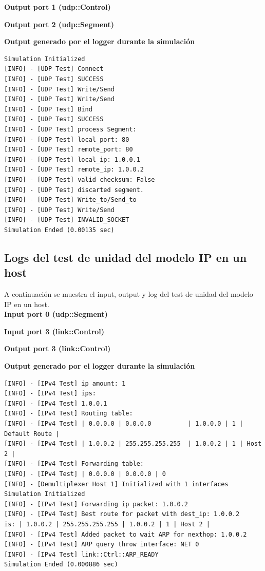 \documentclass[10pt,a4paper]{article}
\begin{document}
\textbf{Output port 1 (udp::Control)}


\textbf{Output port 2 (udp::Segment)}


\textbf{Output generado por el logger durante la simulación}
\begin{lstlisting}
Simulation Initialized
[INFO] - [UDP Test] Connect
[INFO] - [UDP Test] SUCCESS
[INFO] - [UDP Test] Write/Send
[INFO] - [UDP Test] Write/Send
[INFO] - [UDP Test] Bind
[INFO] - [UDP Test] SUCCESS
[INFO] - [UDP Test] process Segment: 
[INFO] - [UDP Test] local_port: 80
[INFO] - [UDP Test] remote_port: 80
[INFO] - [UDP Test] local_ip: 1.0.0.1
[INFO] - [UDP Test] remote_ip: 1.0.0.2
[INFO] - [UDP Test] valid checksum: False
[INFO] - [UDP Test] discarted segment.
[INFO] - [UDP Test] Write_to/Send_to
[INFO] - [UDP Test] Write/Send
[INFO] - [UDP Test] INVALID_SOCKET
Simulation Ended (0.00135 sec)
\end{lstlisting}

\subsection{Logs del test de unidad del modelo IP en un host}
\label{appendix: ip_host unit test}
A continuación se muestra el input, output y log del test de unidad del modelo IP en un host.\\

\textbf{Input port 0 (udp::Segment)}


\textbf{Input port 3 (link::Control)}


\textbf{Output port 3 (link::Control)}


\textbf{Output generado por el logger durante la simulación}
\begin{lstlisting}
[INFO] - [IPv4 Test] ip amount: 1
[INFO] - [IPv4 Test] ips:
[INFO] - [IPv4 Test] 1.0.0.1
[INFO] - [IPv4 Test] Routing table:
[INFO] - [IPv4 Test] | 0.0.0.0 | 0.0.0.0          | 1.0.0.0 | 1 | Default Route |
[INFO] - [IPv4 Test] | 1.0.0.2 | 255.255.255.255  | 1.0.0.2 | 1 | Host 2 |
[INFO] - [IPv4 Test] Forwarding table:
[INFO] - [IPv4 Test] | 0.0.0.0 | 0.0.0.0 | 0 
[INFO] - [Demultiplexer Host 1] Initialized with 1 interfaces
Simulation Initialized
[INFO] - [IPv4 Test] Forwarding ip packet: 1.0.0.2
[INFO] - [IPv4 Test] Best route for packet with dest_ip: 1.0.0.2 
is: | 1.0.0.2 | 255.255.255.255 | 1.0.0.2 | 1 | Host 2 | 
[INFO] - [IPv4 Test] Added packet to wait ARP for nexthop: 1.0.0.2
[INFO] - [IPv4 Test] ARP query throw interface: NET 0
[INFO] - [IPv4 Test] link::Ctrl::ARP_READY
Simulation Ended (0.000886 sec)
\end{lstlisting}
\end{document}

